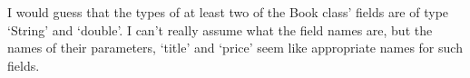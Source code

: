 I would guess that the types of at least two of the Book class' fields
are of type `String' and `double'. I can't really assume what the field
names are, but the names of their parameters, `title' and `price' seem
like appropriate names for such fields.

